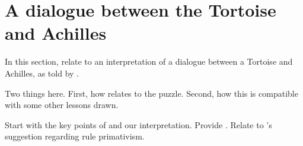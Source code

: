 






\section[The Tortoise and Achilles]{A dialogue between the Tortoise and Achilles}
\label{cha:zS:sec:question:illu:carroll}

\begin{note}
  In this section, relate  to an interpretation of a dialogue between a Tortoise and Achilles, as told by \textcite{Carroll:1895uj}.

  Two things here.
  First, how  relates to the puzzle.
  Second, how this is compatible with some other lessons drawn.

  Start with the key points of \textcite{Carroll:1895uj} and our interpretation.
  Provide .
  Relate to \citeauthor{Boghossian:2008vf}'s suggestion regarding rule primativism.
\end{note}

